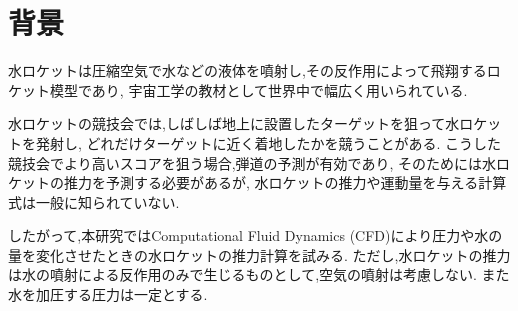 \section{背景}
水ロケットは圧縮空気で水などの液体を噴射し,その反作用によって飛翔するロケット模型であり,
宇宙工学の教材として世界中で幅広く用いられている.

水ロケットの競技会では,しばしば地上に設置したターゲットを狙って水ロケットを発射し,
どれだけターゲットに近く着地したかを競うことがある.
こうした競技会でより高いスコアを狙う場合,弾道の予測が有効であり,
そのためには水ロケットの推力を予測する必要があるが,
水ロケットの推力や運動量を与える計算式は一般に知られていない.

したがって,本研究ではComputational Fluid Dynamics (CFD)により圧力や水の量を変化させたときの水ロケットの推力計算を試みる.
ただし,水ロケットの推力は水の噴射による反作用のみで生じるものとして,空気の噴射は考慮しない.
また水を加圧する圧力は一定とする.